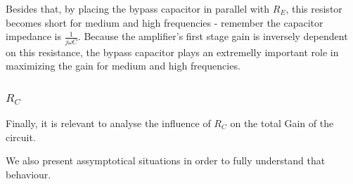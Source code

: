 Besides that, by placing the bypass capacitor in parallel with $R_E$, this resistor becomes short for medium and high frequencies - remember the capacitor impedance is $\frac{1}{j\omega C}$. Because the amplifier's first stage gain is inversely dependent on this resistance, the bypass capacitor plays an extremelly important role in maximizing the gain for medium and high frequencies.

\subsubsection{$R_C$}

Finally, it is relevant to analyse the influence of $R_C$ on the total Gain of the circuit. 

We also present assymptotical situations in order to fully understand that behaviour.


